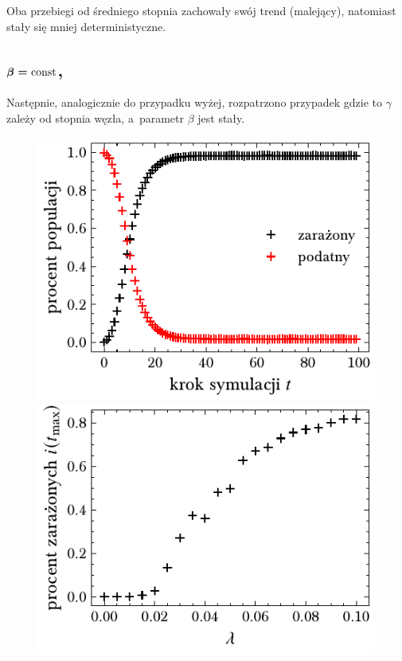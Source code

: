 \documentclass[13pt,a4paper]{article}
\newcommand{\const}{\text{const}}
\begin{document}
Oba przebiegi od średniego stopnia zachowały swój trend (malejący), natomiast stały się mniej deterministyczne.


\subsection{$\boldmath{\beta=\const}$, \texorpdfstring{}{gamma proportional to k}}

Następnie, analogicznie do przypadku wyżej, rozpatrzono przypadek gdzie to $\gamma$ zależy od stopnia węzła, a parametr $\beta$ jest stały.

\begin{figure}[ht!]
	\begin{minipage}[t]{0.49\textwidth}
		\centering
		\includegraphics[width=\textwidth]{../figures/gamma/ba_infected_vs_step.pdf}
	\end{minipage}
	\hspace{\fill}
	\begin{minipage}[t]{0.49\textwidth}
		\centering
		\includegraphics[width=\textwidth]{../figures/gamma/ba_infected_vs_ratio.pdf}

\end{minipage}
\end{figure}
\end{document}
